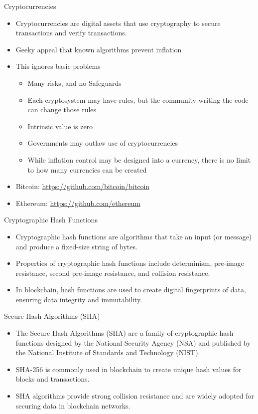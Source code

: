 \begin{frame}{Cryptocurrencies}
    \begin{itemize}
        \item Cryptocurrencies are digital assets that use cryptography to secure transactions and verify transactions.
        \item Geeky appeal that known algorithms prevent inflation
        \item This ignores basic problems
        \begin{itemize}
            \item Many risks, and no Safeguards
            \item Each cryptosystem may have rules, but the community writing the code can change those rules
            \item Intrinsic value is zero
            \item Governments may outlaw use of cryptocurrencies
            \item While inflation control may be designed into a currency, there is no limit to how many currencies can be created
        \end{itemize}
        \item Bitcoin: \url{https://github.com/bitcoin/bitcoin}
        \item Ethereum: \url{https://github.com/ethereum}
    \end{itemize}
\end{frame}

\begin{frame}{Cryptographic Hash Functions}
    \begin{itemize}
        \item Cryptographic hash functions are algorithms that take an input (or message) and produce a fixed-size string of bytes.
        \item Properties of cryptographic hash functions include determinism, pre-image resistance, second pre-image resistance, and collision resistance.
        \item In blockchain, hash functions are used to create digital fingerprints of data, ensuring data integrity and immutability.
    \end{itemize}
\end{frame}

\begin{frame}{Secure Hash Algorithms (SHA)}
    \begin{itemize}
        \item The Secure Hash Algorithms (SHA) are a family of cryptographic hash functions designed by the National Security Agency (NSA) and published by the National Institute of Standards and Technology (NIST).
        \item SHA-256 is commonly used in blockchain to create unique hash values for blocks and transactions.
        \item SHA algorithms provide strong collision resistance and are widely adopted for securing data in blockchain networks.
    \end{itemize}
\end{frame}

